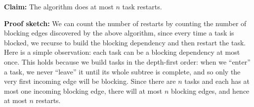 \documentclass[sigconf]{acmart}
\begin{document}
\vspace{2mm}
\noindent
\textbf{Claim:} The algorithm does at most $n$ task restarts.

\vspace{2mm}
\noindent
\textbf{Proof sketch:} We can count the number of restarts by counting the
number of blocking edges discovered by the above algorithm, since every time a
task is blocked, we recurse to build the blocking dependency and then restart
the task. Here is a simple observation: each task can be a blocking dependency
at most once. This holds because we build tasks in the depth-first order: when
we ``enter'' a task, we never ``leave'' it until its whole subtree is complete,
and so only the very first incoming edge will be blocking. Since there are $n$
tasks and each has at most one incoming blocking edge, there will at most $n$
blocking edges, and hence at most $n$ restarts.


\end{document}
